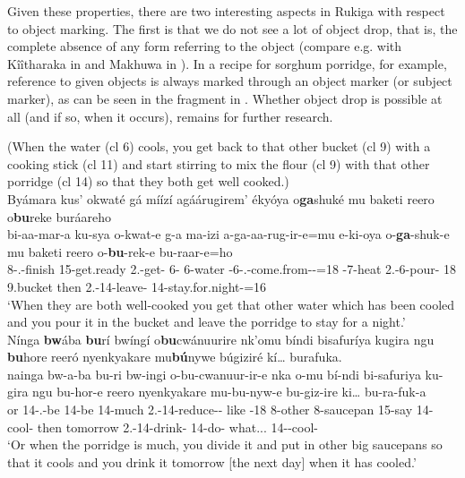 \documentclass[output=paper]{langscibook}
\begin{document}
\z
\z

Given these properties, there are two interesting aspects in Rukiga with respect to object marking. The first is that we do not see a lot of object drop, that is, the complete absence of any form referring to the object (compare e.g. with Kîîtharaka in  \parencite{chapters/kirundi} and Makhuwa in  \parencite{chapters/makhuwa}). In a recipe for sorghum porridge, for example, reference to given objects is always marked through an object marker (or subject marker), as can be seen in the fragment in . Whether object drop is possible at all (and if so, when it occurs), remains for further research.

\ea
\label{bkm:Ref135728579}
(When the water (cl 6) cools, you get back to that other bucket (cl 9) with a cooking stick (cl 11) and start stirring to mix the flour (cl 9) with that other porridge (cl 14) so that they both get well cooked.)\\
Byámara kus’ okwaté gá míízí agáárugirem’ ékyóya o\textbf{ga}shuké mu baketi reero o\textbf{bu}reke buráareho \\
\gll
bi-aa-mar-a  ku-sya  o-kwat-e  g-a  ma-izi  a-ga-aa-rug-ir-e=mu  e-ki-oya  o-\textbf{ga}-shuk-e  mu  baketi  reero  o-\textbf{bu}-rek-e  bu-raar-e=ho\\
8\SM{}-\N{}.\PST{}-finish  15-get.ready  2\SG{}.\SM{}-get-\SBJV{}  6-\DEM{}  6-water  \AUG{}-6\RM{}-\N{}.\PST{}-come.from-\APPL{}-\SBJV{}=18  \AUG{}-7-heat  2\SG{}.\SM{}-6\OM{}-pour-\SBJV{} 18 9.bucket then  2\SG{}.\SM{}-14\OM{}-leave-\SBJV{}  14\SM{}-stay.for.night-\SBJV{}=16 \\
\glt
‘When they are both well-cooked you get that other water which has been cooled and you pour it in the bucket and leave the porridge to stay for a night.’ \\

\sn
Nínga \textbf{bw}ába \textbf{bu}rí bwíngí o\textbf{bu}cwánuurire nk’omu bíndi bisafuríya kugira ngu \textbf{bu}hore reeró nyenkyakare mu\textbf{bú}nywe búgiziré kí… burafuka.\\
\gll
nainga  bw-a-ba  bu-ri  bw-ingi  o-bu-cwanuur-ir-e  nka  o-mu  bí-ndi  bi-safuriya  ku-gira  ngu  bu-hor-e  reero  nyenkyakare  mu-bu-nyw-e  bu-giz-ire  ki…  bu-ra-fuk-a\\
or    14\SM{}-\N{}.\PST{}-be  14\SM{}-be  14-much  2\SG{}.\SM{}-14\OM{}-reduce-\APPL{}-\SBJV{}  like  \AUG{}-18  8-other  8-saucepan  15-say  \COMP{}  14\SM{}-cool-\SBJV{}  then  tomorrow  2\PL{}.\SM{}-14\OM{}-drink-\SBJV{}  14\SM{}-do-\PFV{}  what...  14\SM{}-\IPFV{}-cool-\FV{} \\
\glt
‘Or when the porridge is much, you divide it and put in other big saucepans so that it cools and you drink it tomorrow [the next day] when it has cooled.’
\end{document}
